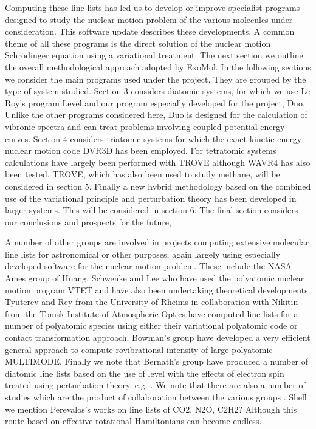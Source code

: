 \documentclass[12pt]{article}
\newcommand{\red}[1]{{\color{red} #1}}
\newcommand{\2}{$_{2}$}
\newcommand{\3}{$_{3}$}
\newcommand{\4}{$_{4}$}
\begin{document}
Computing these line lists has led us to develop or improve specialist
programs designed to study the nuclear motion problem of the various
molecules under consideration.  This software update describes these
developments.  A common theme of all these programs is the direct
solution of the nuclear motion Schr\"odinger equation using a
variational treatment.  The next section we outline the overall
methodological approach adopted by ExoMol. In the following sections
we consider the main programs used under the project. They are grouped
by the type of system studied. Section 3 considers diatomic systems,
for which we use Le Roy's program {\sc Level} \cite{lr07} and our
program especially developed for the project, {\sc Duo}.\cite{jt609}
Unlike the other programs considered here, {\sc Duo} is designed for
the calculation of vibronic spectra and can treat problems involving
coupled potential energy curves. Section 4 considers triatomic systems
for which the exact kinetic energy nuclear motion code {\sc DVR3D}
\cite{DVR3D} has been employed. For tetratomic systems calculations
have largely been performed with {\sc TROVE} \cite{07YuThJe.method}
although {\sc WAVR4} \cite{WAVR4} has also been tested.\cite{t553}
{\sc TROVE}, which has also been used to study methane, will be
considered in section 5.  Finally a new hybrid methodology based on
the combined use of the variational principle and perturbation theory
has been developed in larger systems. This will be considered in
section 6. The final section considers our conclusions and prospects
for the future,

A number of other groups are involved in projects computing extensive
molecular line lists for astronomical or other purposes, again largely
using especially developed software for the nuclear motion problem.
These include the NASA Ames group of Huang, Schwenke and Lee who have
used the polyatomic nuclear motion program {\sc VTET}
\cite{VTET} and have also been undertaking theoretical
developments.\cite{15Schwenke.diatom}  Tyuterev and Rey from the 
University of Rheims in collaboration with Nikitin from the Tomsk Institute of Atmospheric Optics  have computed line lists for a number of polyatomic species using either their variational polyatomic code
or contact transformation approach. Bowman's group have developed a very efficient general approach to compute 
rovibrational intensity of large polyatomic  MULTIMODE.\cite{MULTIMODE}
Finally we note that Bernath's group
have produced a number of diatomic line lists based on the use of {\sc
level} with the effects of electron spin treated using perturbation
theory, e.g. \citet{14BrBeWe.NH,14MaPlVa.CH,14RaBrWe.CP}.  We note that
there are also a number of studies which are the product of collaboration between the various groups
\cite{jt583,jt635,14BrRsWe.CN,jtNO}.
\red{Shell we mention Perevalos's works on line lists of CO2, N2O, C2H2? Although this route based on effective-rotational Hamiltonians can become endless.}
\end{document}
